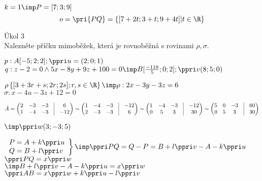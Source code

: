 	  $k=1 \imp P = [7;3;9]$
	  $$ o = \pri{PQ} = \zs{[7+2t;3+t;9+4t]|t\in\R} $$

	  \Pr Úkol 3\\
	  Nalezněte příčku mimoběžek, která je
rovnoběžná s rovinami $\rho, \sigma$.

$p:A[-5;2;2];\ve u = (2;0;1)$\\
$q:z-2=0\land 5x-8y+9z+100=0 \imp B[\f{-118}5;0;2]; \ve v(8;5;0)$

$\rho \zs{[3+3r+s;2r;2s];r,s\in\R} \imp \rho: 2x-3y-3z = 6$\\
$\sigma: x-4u-3z+12=0$

 $ \bar{A} = \begin{pmatrix}
	 2 &-3 &-3 &\vline& 6 \\ 
	 1 &-4 &-3 &\vline& -12 \\ 
 \end{pmatrix}
 \sim
 \begin{pmatrix}
	 1 &-4 &-3 &\vline& -12 \\ 
	 2 &-3 &-3 &\vline& 6 \\ 
 \end{pmatrix}
 \sim
 \begin{pmatrix}
	 1 &-4 &-3 &\vline& -12 \\ 
	 0 &5 &3 &\vline& 30 \\ 
 \end{pmatrix}
 \sim
 \begin{pmatrix}
	 5 &0 &-3 &\vline& 60 \\ 
	 0 &5 &3 &\vline& 30 \\ 
 \end{pmatrix}
  $ 

$\imp \ve w(3;-3;5)$

$\left.\begin{array}{l} P = A + k \* \ve u\\ Q = B + l\* \ve v\end{array}\right\} \imp \ve{PQ} = Q - P = B + l \ve{v} - A - k\ve u$\\
	$\ve{PQ} = x \ve w $\\
	$\imp B + l \* \ve v - A - k \ve u = x \ve w$\\
	$\ve {AB} = x \ve w + k \ve u - l \ve v$

